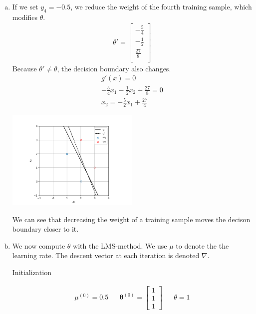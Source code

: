 \documentclass[a4paper, 10pt, twoside]{article}
\begin{document}
\begin{enumerate}[a)]
    \item If we set $y_4=-0.5$, we reduce the weight of the fourth training sample, which modifies $\theta$.
          \begin{align*}
              \theta' =
              \begin{bmatrix}
                  -\frac{5}{4} \\
                  -\frac{1}{2} \\
                  \frac{27}{8} \\
              \end{bmatrix}
          \end{align*}
          Because $\theta' \neq \theta$, the decision boundary also changes.
          \begin{align*}
              g'(x) = 0                                             \\
              -\frac{5}{4} x_1 - \frac{1}{2} x_2 + \frac{27}{8} = 0 \\
              x_2 = -\frac{5}{2} x_1 + \frac{27}{4}
          \end{align*}
          \begin{center}
              \includegraphics[width=0.5\textwidth]{graph3.png}
          \end{center}
          We can see that decreasing the weight of a training sample moves the decison boundary closer to it.

    \item We now compute $\theta$ with the LMS-method. We use $\mu$ to denote the the learning rate. The descent vector at each iteration is denoted $\nabla$.

          Initialization

          \begin{align*}
              \mu^{(0)} = 0.5
               &  &
              \bm{\theta}^{(0)} =
              \begin{bmatrix}
                  1 \\ 1 \\ 1
              \end{bmatrix}
               &  &
              \theta = 1
          \end{align*}


\end{enumerate}
\end{document}
